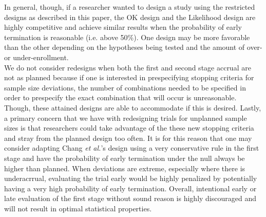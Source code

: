 \documentclass[12pt]{report}\usepackage[]{graphicx}\usepackage[]{color}
\newlength{\li}\setlength{\li}{14.48pt}
\newlength{\di}\setlength{\di}{-3.5mm}
\begin{document}
\indent In general, though, if a researcher wanted to design a study using the restricted designs as described in this paper, the OK design and the Likelihood design are highly competitive and achieve similar results when the probability of early termination is reasonable (i.e. above 50\%). One design may be more favorable than the other depending on the hypotheses being tested and the amount of over- or under-enrollment. \\
\indent We do not consider redesigns when both the first and second stage accrual are not as planned because if one is interested in prespecifying stopping criteria for sample size deviations, the number of combinations needed to be specified in order to prespecify the exact combination that will occur is unreasonable. Though, these attained designs are able to accommodate if this is desired. Lastly, a primary concern that we have with redesigning trials for unplanned sample sizes is that researchers could take advantage of the these new stopping criteria and stray from the planned design too often. It is for this reason that one may consider adapting Chang \textit{et al.}'s design using a very conservative rule in the first stage and have the probability of early termination under the null always be higher than planned. When deviations are extreme, especially where there is underacrrual, evaluating the trial early would be highly penalized by potentially having a very high probability of early termination. Overall, intentional early or late evaluation of the first stage without sound reason is highly discouraged and will not result in optimal statistical properties. 







%

		
\end{document}
